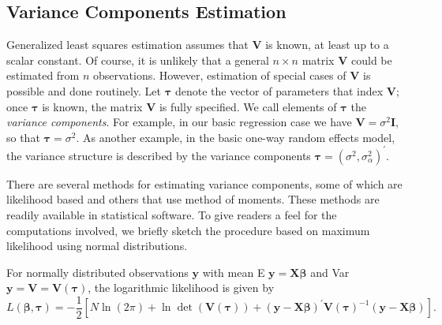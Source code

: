 \subsection{Variance Components
Estimation}\label{S15:VarComp}

Generalized least squares estimation assumes that $\mathbf{V}$ is
known, at least up to a scalar constant. Of course, it is unlikely
that a general $n \times n$ matrix $\mathbf{V}$  could be estimated
from $n$ observations. However, estimation of special cases of
$\mathbf{V}$ is possible and done routinely. Let $\boldsymbol \tau$
denote the vector of parameters that index $\mathbf{V}$; once
$\boldsymbol \tau$ is known, the matrix $\mathbf{V}$  is fully
specified. We call elements of $\boldsymbol \tau$ the \emph{variance
components}. For example, in our basic regression case we have
$\mathbf{V} = \sigma^2 \mathbf{I}$, so that $\boldsymbol \tau =
\sigma^2$. As another example, in the basic one-way random effects
model, the variance structure is described by the variance
components $\boldsymbol \tau = (\sigma^2,
\sigma^2_{\alpha})^{\prime}$.

There are several methods for estimating variance components, some
of which are likelihood based and others that use method of moments.
These methods are readily available in statistical software. To give
readers a feel for the computations involved, we briefly sketch the
procedure based on maximum likelihood using normal distributions.

For normally distributed observations $\mathbf{y}$ with mean E
$\mathbf{y} = \mathbf{X} \boldsymbol \beta$ and Var $\mathbf{y} =
\mathbf{V} = \mathbf{V (\boldsymbol \tau)}$, the logarithmic
likelihood is given by
\begin{equation}\label{E15:MLMLikelihood}
L(\boldsymbol \beta, \boldsymbol \tau ) = - \frac{1}{2} \left[ N \ln
(2 \pi) + \ln \det (\mathbf{V (\boldsymbol \tau)}) + (\mathbf{y} -
\mathbf{X} \boldsymbol \beta)^{\prime} \mathbf{V (\boldsymbol
\tau)}^{-1} (\mathbf{y} - \mathbf{X} \boldsymbol \beta) \right].
\end{equation}


